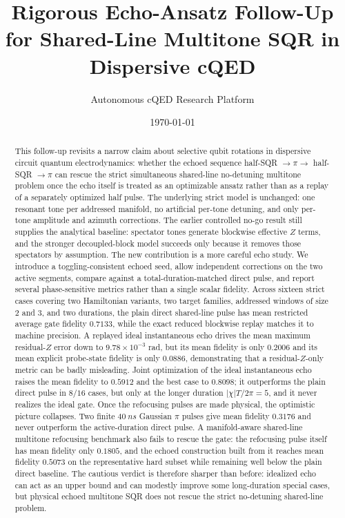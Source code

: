\documentclass[aps,pra,twocolumn,reprint,floatfix,amsmath,amssymb]{revtex4-2}
\begin{document}
\title{\texorpdfstring{Rigorous Echo-Ansatz Follow-Up for Shared-Line Multitone SQR in Dispersive cQED}{Rigorous Echo-Ansatz Follow-Up for Shared-Line Multitone SQR in Dispersive cQED}}
\author{Autonomous cQED Research Platform}
\date{\today}

\begin{abstract}
This follow-up revisits a narrow claim about selective qubit rotations in dispersive circuit quantum electrodynamics: whether the echoed sequence half-SQR \(\rightarrow \pi \rightarrow\) half-SQR \(\rightarrow \pi\) can rescue the strict simultaneous shared-line no-detuning multitone problem once the echo itself is treated as an optimizable ansatz rather than as a replay of a separately optimized half pulse. The underlying strict model is unchanged: one resonant tone per addressed manifold, no artificial per-tone detuning, and only per-tone amplitude and azimuth corrections. The earlier controlled no-go result still supplies the analytical baseline: spectator tones generate blockwise effective \(Z\) terms, and the stronger decoupled-block model succeeds only because it removes those spectators by assumption. The new contribution is a more careful echo study. We introduce a toggling-consistent echoed seed, allow independent corrections on the two active segments, compare against a total-duration-matched direct pulse, and report several phase-sensitive metrics rather than a single scalar fidelity. Across sixteen strict cases covering two Hamiltonian variants, two target families, addressed windows of size \(2\) and \(3\), and two durations, the plain direct shared-line pulse has mean restricted average gate fidelity \(0.7133\), while the exact reduced blockwise replay matches it to machine precision. A replayed ideal instantaneous echo drives the mean maximum residual-\(Z\) error down to \(9.78\times 10^{-3}\) rad, but its mean fidelity is only \(0.2006\) and its mean explicit probe-state fidelity is only \(0.0886\), demonstrating that a residual-\(Z\)-only metric can be badly misleading. Joint optimization of the ideal instantaneous echo raises the mean fidelity to \(0.5912\) and the best case to \(0.8098\); it outperforms the plain direct pulse in \(8/16\) cases, but only at the longer duration \(|\chi|T/2\pi=5\), and it never realizes the ideal gate. Once the refocusing pulses are made physical, the optimistic picture collapses. Two finite \(\SI{40}{ns}\) Gaussian \(\pi\) pulses give mean fidelity \(0.3176\) and never outperform the active-duration direct pulse. A manifold-aware shared-line multitone refocusing benchmark also fails to rescue the gate: the refocusing pulse itself has mean fidelity only \(0.1805\), and the echoed construction built from it reaches mean fidelity \(0.5073\) on the representative hard subset while remaining well below the plain direct baseline. The cautious verdict is therefore sharper than before: idealized echo can act as an upper bound and can modestly improve some long-duration special cases, but physical echoed multitone SQR does not rescue the strict no-detuning shared-line problem.
\end{abstract}
\end{document}
